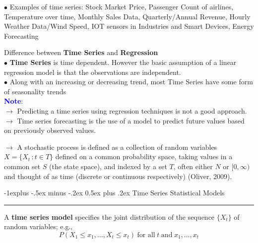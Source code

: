 \documentclass[letterpaper, 10.5pt,landscape]{article}
\makeatletter
\renewcommand{\subsection}{\@startsection{subsection}{2}{0mm}%
                                {-1explus -.5ex minus -.2ex}%
                                {0.5ex plus .2ex}%
                                {\normalfont\normalsize\bfseries}}
\makeatother
\begin{document}
\begin{multicols*}{3}
\vspace{2pt}
$\bullet$ Examples of time series: Stock Market Price, Passenger Count of airlines, Temperature over time, Monthly Sales Data, Quarterly/Annual Revenue, Hourly Weather Data/Wind Speed, IOT sensors in Industries and Smart Devices, Energy Forecasting

\vspace{3pt}
Difference between \textbf{Time Series} and \textbf{Regression} \\
$\bullet$ \textbf{Time Series} is time dependent. However the basic assumption of a linear regression model is that the observations are independent. \\
$\bullet$ Along with an increasing or decreasing trend, most Time Series have some form of seasonality trends\\

\vspace{3pt}
\textcolor{blue}{\textbf{Note}:}\\
$\rightarrow$ Predicting a time series using regression techniques is not a good approach. \\
$\rightarrow$ Time series forecasting is the use of a model to predict future values based on previously observed values.


\vspace{5pt}
$\rightarrow$ A stochastic process is defined as a collection of random variables $X=\{X_{t} \hspace{2pt}: t \in T\}$ defined on a common probability space, taking values in a common set $S$ (the state space), and indexed by a set $T$, often either $N$ or $[0, \infty)$ and thought of as time (discrete or continuous respectively) (Oliver, 2009).



\subsection{Time Series Statistical Models} {\color{teal}\hrule height 0.5pt} \smallskip

A \textbf{time series model} specifies the joint distribution of the sequence $\{X_{t} \}$ of random variables; e.g., 
\vspace{-3pt}
\[P\left(X_{1} \leq x_{1}, \ldots, X_{t} \leq x_{t}\right) \hspace{3pt} \text{for all} \hspace{3pt} t \hspace{3pt} \text{and} \hspace{3pt} x_{1},\ldots, x_{t} \]


\end{multicols*}
\end{document}
